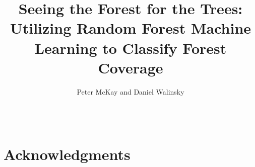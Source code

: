 \documentclass[twoside,letterpaper]{soups}
\begin{document}
%


\title{\Large \bf Seeing the Forest for the Trees: \\
Utilizing Random Forest Machine Learning to Classify Forest Coverage
}
\author{
Peter McKay and Daniel Walinsky\\
\\
\\
}
\maketitle









\section{Acknowledgments}




\end{document}
